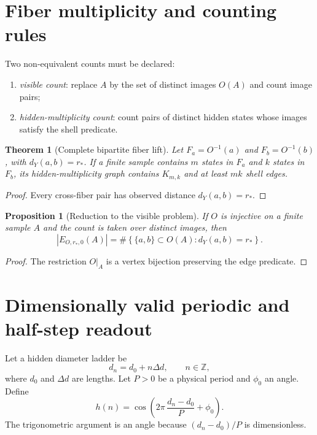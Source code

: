 \documentclass[11pt,a4paper]{article}
\theoremstyle{definition}
\theoremstyle{plain}
\newtheorem{theorem}[definition]{Theorem}
\newtheorem{proposition}[definition]{Proposition}
\theoremstyle{remark}
\newcommand{\Z}{\mathbb{Z}}
\newcommand{\abs}[1]{\left\lvert #1\right\rvert}
\newcommand{\set}[1]{\left\{#1\right\}}
\begin{document}
\section{Fiber multiplicity and counting rules}

Two non-equivalent counts must be declared:
\begin{enumerate}[label=(\alph*)]
\item \emph{visible count}: replace $A$ by the set of distinct images
      $O(A)$ and count image pairs;
\item \emph{hidden-multiplicity count}: count pairs of distinct hidden
      states whose images satisfy the shell predicate.
\end{enumerate}

\begin{theorem}[Complete bipartite fiber lift]
\label{thm:fibers}
Let $F_a=O^{-1}(a)$ and $F_b=O^{-1}(b)$, with
$d_Y(a,b)=r_*$. If a finite sample contains $m$ states in $F_a$ and $k$
states in $F_b$, its hidden-multiplicity graph contains $K_{m,k}$ and at
least $mk$ shell edges.
\end{theorem}

\begin{proof}
Every cross-fiber pair has observed distance $d_Y(a,b)=r_*$.
\end{proof}

\begin{proposition}[Reduction to the visible problem]
If $O$ is injective on a finite sample $A$ and the count is taken over
distinct images, then
\[
 \abs{E_{O,r_*,0}(A)}
 =
 \#\set{\{a,b\}\subset O(A):d_Y(a,b)=r_*}.
\]
\end{proposition}

\begin{proof}
The restriction $O|_A$ is a vertex bijection preserving the edge
predicate.
\end{proof}

\section{Dimensionally valid periodic and half-step readout}

Let a hidden diameter ladder be
\[
 d_n=d_0+n\Delta d,\qquad n\in\Z,
\]
where $d_0$ and $\Delta d$ are lengths. Let $P>0$ be a physical period and
$\phi_0$ an angle. Define
\[
 h(n)
 =
 \cos\left(
 2\pi\,\frac{d_n-d_0}{P}+\phi_0
 \right).
\]
The trigonometric argument is an angle because $(d_n-d_0)/P$ is
dimensionless.
\end{document}
